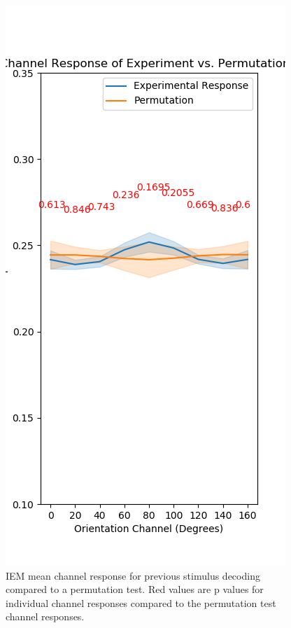 \documentclass[../main.tex]{subfiles}
\begin{document}
\begin{figure}
    \centering
    \includegraphics[scale=0.7]{figures/results/perm_response_prev.png}
    \caption{IEM mean channel response for previous stimulus decoding compared to a permutation test. Red values are p values for individual channel responses compared to the permutation test channel responses.}
    \label{iem_ch_response_prev}
\end{figure}
\end{document}
